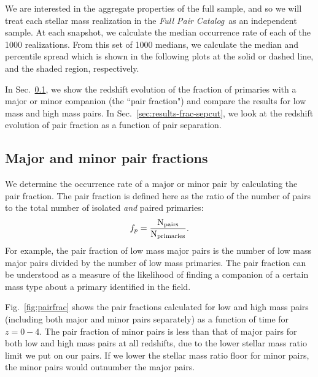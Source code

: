 \documentclass[twocolumn]{aastex631}
\newcommand{\kc}[1]{\textcolor{yellow}{\textbf{kc: #1}} }
\newcommand{\paircat}{\textit{Full Pair Catalog}}
\begin{document}
We are interested in the aggregate properties of the full sample, and so we will treat each stellar mass realization in the \paircat\ as an independent sample. 
At each snapshot, we calculate the median occurrence rate of each of the 1000 realizations. 
From this set of 1000 medians, we calculate the median and percentile spread which is shown in the following plots at the solid or dashed line, and the shaded region, respectively. 

In Sec.~\ref{sec:results-frac}, we show the redshift evolution of the fraction of primaries with a major or minor companion (the ``pair fraction") and compare the results for low mass and high mass pairs.
In Sec.~\ref{sec:results-frac-sepcut}, we look at the redshift evolution of pair fraction as a function of pair separation. 


    \subsection{Major and minor pair fractions}\label{sec:results-frac}
    We determine the occurrence rate of a major or minor pair by calculating the pair fraction. 
    The pair fraction is defined here as the ratio of the number of pairs to the total number of isolated \textit{and} paired primaries:
    $$f_{p}=\rm \frac{N_{pairs}}{N_{primaries}}.$$
    For example, the pair fraction of low mass major pairs is the number of low mass major pairs divided by the number of low mass primaries. 
    The pair fraction can be understood as a measure of the likelihood of finding a companion of a certain mass type about a primary identified in the field.
    
    Fig.~\ref{fig:pairfrac} shows the pair fractions calculated for low and high mass pairs (including both major and minor pairs separately) as a function of time for $z=0-4$. 
    The pair fraction of minor pairs is less than that of major pairs for both low and high mass pairs at all redshifts, due to the lower stellar mass ratio limit we put on our pairs.
    If we lower the stellar mass ratio floor for minor pairs, the minor pairs would outnumber the major pairs.
    
\end{document}
